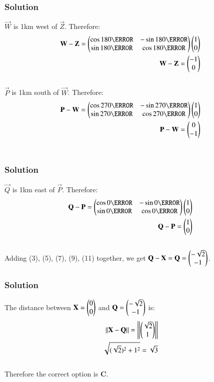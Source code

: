 \documentclass{beamer}
\begin{document}
\begin{frame}[fragile]
    \frametitle{Solution}
$\vec{W}$ is 1km west of $\vec{Z}$. Therefore:\begin{align}
\vec{W}-\vec{Z} = \myvec{\cos180\degree & -\sin180\degree \\ \sin180\degree & \cos180\degree}\myvec{1\\0}\\
\vec{W}-\vec{Z} = \myvec{-1\\0}
\end{align}\\
$\vec{P}$ is 1km south of $\vec{W}$. Therefore:\begin{align}
\vec{P}-\vec{W} = \myvec{\cos270\degree & -\sin270\degree \\ \sin270\degree & \cos270\degree}\myvec{1\\0}\\
\vec{P}-\vec{W} = \myvec{0\\-1}
\end{align}\\
\end{frame}

\begin{frame}[fragile]
    \frametitle{Solution}
$\vec{Q}$ is 1km east of $\vec{P}$. Therefore:\begin{align}
\vec{Q}-\vec{P} = \myvec{\cos0\degree & -\sin0\degree \\ \sin0\degree & \cos0\degree}\myvec{1\\0}\\
\vec{Q}-\vec{P} = \myvec{1\\0}
\end{align}\\
Adding (3), (5), (7), (9), (11) together, we get $\mathbf{Q}-\mathbf{X} =\mathbf{Q} = \begin{pmatrix}-\sqrt{2}\\-1\end{pmatrix}$.
\end{frame}

\begin{frame}[fragile]
    \frametitle{Solution}
The distance between $\mathbf{X}=\begin{pmatrix}0\\0\end{pmatrix}$ and $\mathbf{Q}=\begin{pmatrix}-\sqrt{2}\\-1\end{pmatrix}$ is:
\begin{align}
    ||\mathbf{X} - \mathbf{Q}||= \left\lVert\begin{pmatrix}\sqrt{2}\\1\end{pmatrix}\right\rVert \\
    \sqrt{(\sqrt{2})^2 +1^2} = \sqrt{3}
\end{align}\\
Therefore the correct option is \textbf{C}.
\end{frame}
\end{document}
